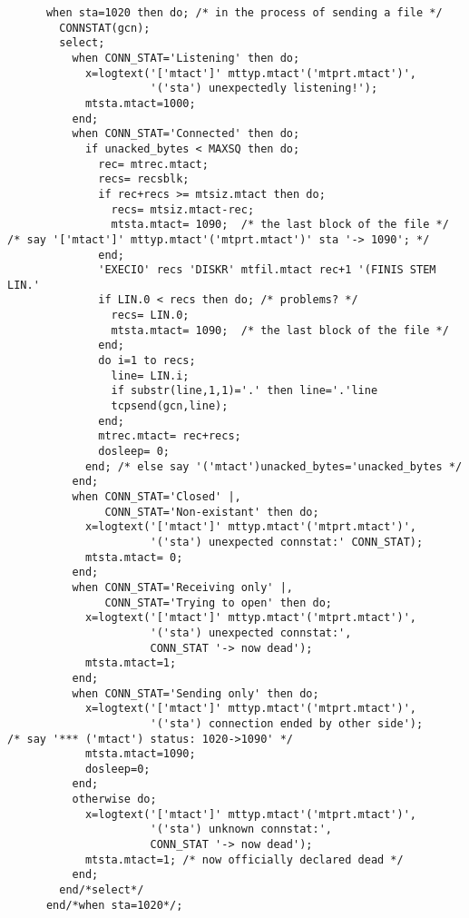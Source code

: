 \begin{verbatim}
      when sta=1020 then do; /* in the process of sending a file */
        CONNSTAT(gcn);
        select;
          when CONN_STAT='Listening' then do;
            x=logtext('['mtact']' mttyp.mtact'('mtprt.mtact')',
                      '('sta') unexpectedly listening!');
            mtsta.mtact=1000;
          end;
          when CONN_STAT='Connected' then do;
            if unacked_bytes < MAXSQ then do;
              rec= mtrec.mtact;
              recs= recsblk;
              if rec+recs >= mtsiz.mtact then do;
                recs= mtsiz.mtact-rec;
                mtsta.mtact= 1090;  /* the last block of the file */
/* say '['mtact']' mttyp.mtact'('mtprt.mtact')' sta '-> 1090'; */
              end;
              'EXECIO' recs 'DISKR' mtfil.mtact rec+1 '(FINIS STEM LIN.'
              if LIN.0 < recs then do; /* problems? */
                recs= LIN.0;
                mtsta.mtact= 1090;  /* the last block of the file */
              end;
              do i=1 to recs;
                line= LIN.i;
                if substr(line,1,1)='.' then line='.'line
                tcpsend(gcn,line);
              end;
              mtrec.mtact= rec+recs;
              dosleep= 0;
            end; /* else say '('mtact')unacked_bytes='unacked_bytes */
          end;
          when CONN_STAT='Closed' |,
               CONN_STAT='Non-existant' then do;
            x=logtext('['mtact']' mttyp.mtact'('mtprt.mtact')',
                      '('sta') unexpected connstat:' CONN_STAT);
            mtsta.mtact= 0;
          end;
          when CONN_STAT='Receiving only' |,
               CONN_STAT='Trying to open' then do;
            x=logtext('['mtact']' mttyp.mtact'('mtprt.mtact')',
                      '('sta') unexpected connstat:',
                      CONN_STAT '-> now dead');
            mtsta.mtact=1;
          end;
          when CONN_STAT='Sending only' then do;
            x=logtext('['mtact']' mttyp.mtact'('mtprt.mtact')',
                      '('sta') connection ended by other side');
/* say '*** ('mtact') status: 1020->1090' */
            mtsta.mtact=1090;
            dosleep=0;
          end;
          otherwise do;
            x=logtext('['mtact']' mttyp.mtact'('mtprt.mtact')',
                      '('sta') unknown connstat:',
                      CONN_STAT '-> now dead');
            mtsta.mtact=1; /* now officially declared dead */
          end;
        end/*select*/
      end/*when sta=1020*/;


\end{verbatim}
